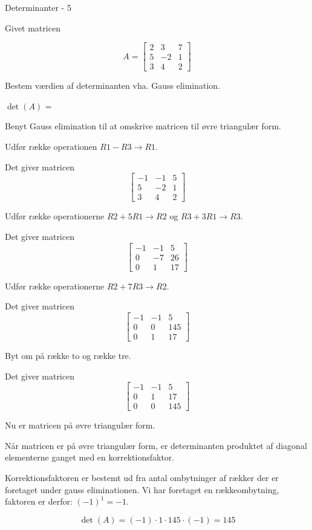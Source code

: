 \documentclass{article}
\begin{document}
\begin{exercise}{Determinanter - 5}

Givet matricen

\[
A = \left[\begin{array}{rrr}
2 & 3 & 7 \\
5 & -2 & 1 \\
3 & 4 & 2
\end{array} \right]
\]

Bestem værdien af determinanten vha. Gauss elimination.

$\det(A)$ = 

\hint
Benyt Gauss elimination til at omskrive matricen til
øvre triangulær form.

\hint
Udfør række operationen
$R1 - R3 \to R1$.

\hint
Det giver matricen
\[
\left[\begin{array}{rrr}
-1 & -1 & 5 \\
5 & -2 & 1 \\
3 & 4 & 2
\end{array} \right]
\]

\hint
Udfør række operationerne
$R2 + 5R1 \to R2$ og $R3 + 3R1 \to R3$.

\hint
Det giver matricen
\[
\left[\begin{array}{rrr}
-1 & -1 & 5 \\
0 & -7 & 26 \\
0 & 1 & 17
\end{array} \right]
\]

\hint
Udfør række operationerne
$R2 + 7R3 \to R2$.

\hint
Det giver matricen
\[
\left[\begin{array}{rrr}
-1 & -1 & 5 \\
0 & 0 & 145 \\
0 & 1 & 17
\end{array} \right]
\]

\hint
Byt om på række to og række tre.

\hint
Det giver matricen
\[
\left[\begin{array}{rrr}
-1 & -1 & 5 \\
0 & 1 & 17 \\
0 & 0 & 145
\end{array} \right]
\]

\hint
Nu er matricen på øvre triangulær form.

\hint
Når matricen er på øvre triangulær form, er determinanten
produktet af diagonal elementerne ganget med en korrektionsfaktor.

\hint
Korrektionsfaktoren er bestemt ud fra antal ombytninger af rækker
der er foretaget under gauss eliminationen.
Vi har foretaget en rækkeombytning, faktoren er derfor: $(-1)^1 = -1$.

\hint
\[
\det(A) = (-1) \cdot 1 \cdot 145 \cdot (-1) = 145
\]

\end{exercise}
\end{document}
